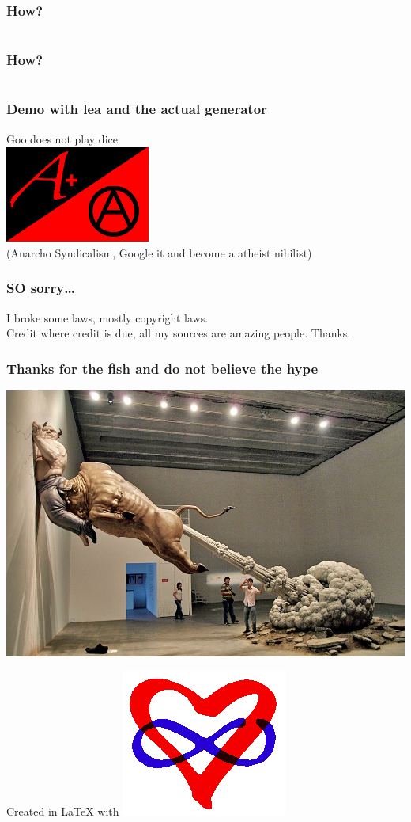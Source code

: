 \documentclass[a4paper]{beamer}
\begin{document}
\begin{frame}
\frametitle{How?} 
\inputminted[firstline=215, lastline=222, gobble=0, linenos, mathescape, bgcolor=bg, numbersep=8pt, frame=lines, framesep=3mm, fontsize=\scriptsize]{python}{code/bullshit_generator.py}
\end{frame}

\begin{frame}
\frametitle{How?} 
\inputminted[firstline=243, lastline=254, gobble=0, linenos, mathescape, bgcolor=bg, numbersep=8pt, frame=lines, framesep=3mm, fontsize=\scriptsize]{python}{code/bullshit_generator.py}
\end{frame}

\begin{frame}
\frametitle{Demo with lea and the actual generator}
Goo does not play dice
\\
\includegraphics[scale=0.60]{img/mjr_anarchist_flag.jpg}
\\
(Anarcho Syndicalism, Google it and become a atheist nihilist)
\end{frame}

\begin{frame}
\frametitle{SO sorry\ldots}
I broke some laws, mostly copyright laws.
\\
Credit where credit is due, all my sources are amazing people. Thanks.
\end{frame}

\begin{frame}
\frametitle{Thanks for the fish and do not believe the hype}
\begin{center}
\includegraphics[scale=1.00]{img/bullshit-sculpture.jpg}
\end{center}
Created in \LaTeX{} with \includegraphics[scale=0.05]{img/polyamory.png}
\end{frame}
\end{document}
